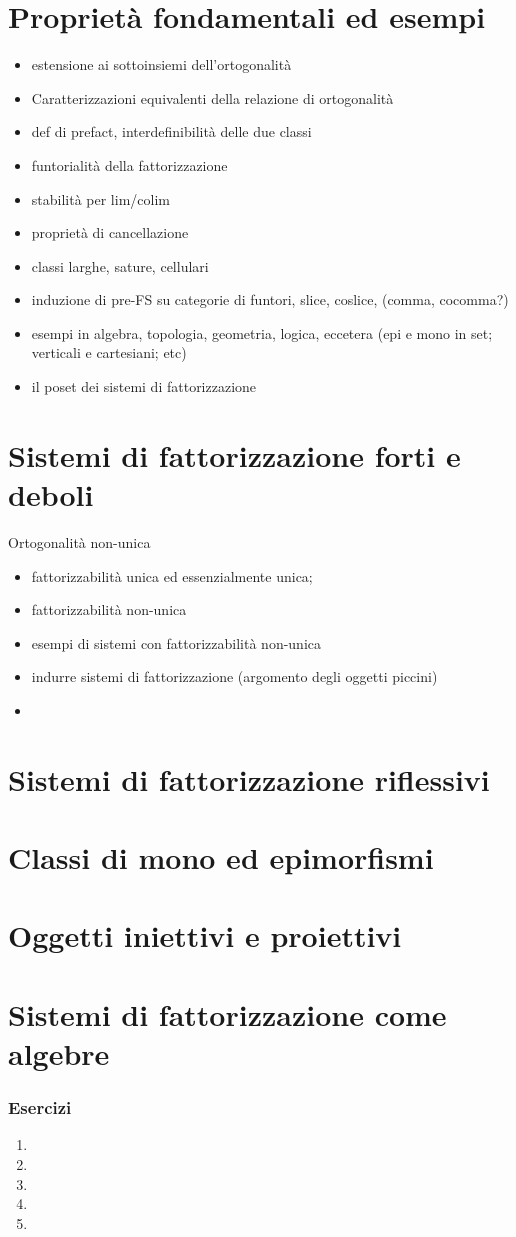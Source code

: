 \section[Proprietà ed esempi]{Proprietà fondamentali ed esempi}
\begin{itemize}
	\item estensione ai sottoinsiemi dell'ortogonalità
	\item Caratterizzazioni equivalenti della relazione di ortogonalità
	\item def di prefact, interdefinibilità delle due classi
	\item funtorialità della fattorizzazione
	\item stabilità per lim/colim
	\item proprietà di cancellazione
	\item classi larghe, sature, cellulari
	\item induzione di pre-FS su categorie di funtori, slice, coslice, (comma, cocomma?)
	\item esempi in algebra, topologia, geometria, logica, eccetera (epi e mono in set; verticali e cartesiani; etc)
	\item il poset dei sistemi di fattorizzazione
\end{itemize}
\section[Fattorizzazione]{Sistemi di fattorizzazione forti e deboli}
Ortogonalità non-unica
\begin{itemize}
	\item fattorizzabilità unica ed essenzialmente unica;
	\item fattorizzabilità non-unica
	\item esempi di sistemi con fattorizzabilità non-unica
	\item indurre sistemi di fattorizzazione (argomento degli oggetti piccini)
	\item
\end{itemize}
\section[Riflessività]{Sistemi di fattorizzazione riflessivi}
\section[Mono ed epimorfismi]{Classi di mono ed epimorfismi}
\section[Iniettivi e proiettivi]{Oggetti iniettivi e proiettivi}
\section[Fattorizzazione e algebre]{Sistemi di fattorizzazione come algebre}
\subsubsection*{Esercizi}
\begin{enumerate}
	\item
	\item
	\item
	\item
	\item
\end{enumerate}
